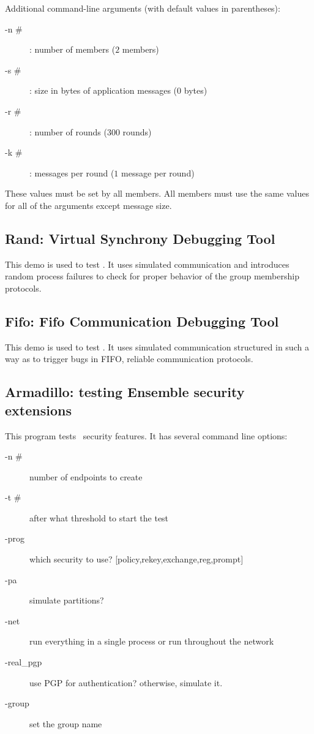 Additional command-line arguments (with default values in parentheses):
\begin{description}
\item [-n \#]: number of members ($2$ members)
\item [-s \#]: size in bytes of application messages ($0$ bytes)
\item [-r \#]: number of rounds ($300$ rounds)
\item [-k \#]: messages per round ($1$ message per round)
\end{description}
These values must be set by all members.  All members must use the
same values for all of the arguments except message size.


\subsection{Rand: Virtual Synchrony Debugging Tool}
This demo is used to test \ensemble.  It uses simulated communication and
introduces random process failures to check for proper behavior of the group
membership protocols.

\subsection{Fifo: Fifo Communication Debugging Tool}
This demo is used to test \ensemble.  It uses simulated communication
structured in such a way as to trigger bugs in FIFO, reliable communication
protocols.

\subsection{Armadillo: testing Ensemble security extensions}
This program tests \ensemble\ security features. It has several
command line options:
\begin{description}
\item[-n \#]  number of endpoints to create
\item[-t \#]  after what threshold to start the test
\item[-prog] which security to use? [policy,rekey,exchange,reg,prompt]
\item[-pa]   simulate partitions? 
\item[-net]  run everything in a single process or run throughout the  network
\item[-real\_pgp]  use PGP for authentication? otherwise, simulate it.
\item[-group]    set the group name
\end{description}

